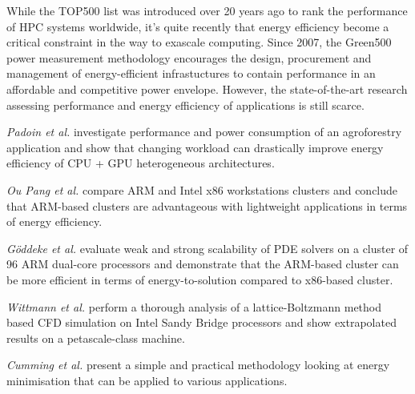 While the  TOP500 list was  introduced over 20  years ago to  rank the
performance of HPC systems  worldwide, it's quite recently that energy
efficiency  become  a  critical  constraint  in the  way  to  exascale
computing.   Since 2007,  the Green500  power  measurement methodology
encourages the design,  procurement and management of energy-efficient
infrastuctures to contain performance in an affordable and competitive
power  envelope.   However,  the state-of-the-art  research  assessing
performance  and energy  efficiency  of applications  is still scarce.

\emph{Padoin et al.}   \citep{Padoin-2013} investigate performance and
power  consumption  of  an  agroforestry  application  and  show  that
changing workload  can drastically improve energy efficiency  of CPU +
GPU heterogeneous architectures.

\emph{Ou  Pang et  al.}   \citep{Ou-2012} compare  ARM  and Intel  x86
workstations  clusters  and   conclude  that  ARM-based  clusters  are
advantageous  with   lightweight  applications  in   terms  of  energy
efficiency.

\emph{G\"oddeke et al.}  \citep{Goddeke-2013} evaluate weak and strong
scalability of PDE solvers on a cluster of 96 ARM dual-core processors
and demonstrate  that the ARM-based  cluster can be more  efficient in
terms of energy-to-solution compared to x86-based cluster.

\emph{Wittmann  et  al.}   \citep{Wittmann-2013}  perform  a  thorough
analysis of  a lattice-Boltzmann method based CFD  simulation on Intel
Sandy Bridge  processors   and  show   extrapolated  results   on  a
petascale-class machine.

\emph{Cumming  et  al.}   \citep{Cumming-2014}  present a  simple  and
practical  methodology  looking at  energy  minimisation  that can  be
applied to various applications.
